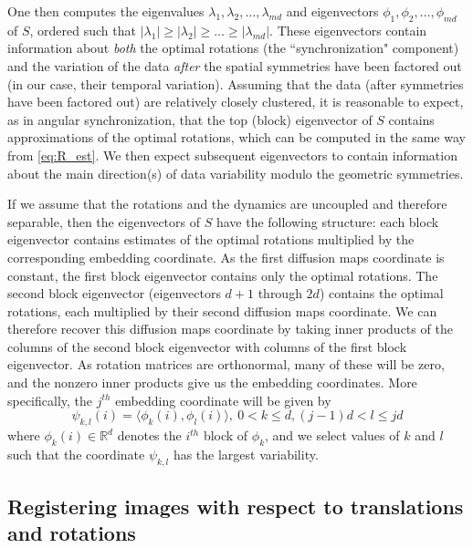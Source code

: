 \documentclass[12pt]{article}
\begin{document}
One then computes the eigenvalues $\lambda_1, \lambda_2, \dots, \lambda_{md}$ and eigenvectors $\phi_1, \phi_2, \dots, \phi_{md}$ of $S$, ordered such that $|\lambda_1| \ge |\lambda_2| \ge \dots \ge |\lambda_{md}|$.
%
These eigenvectors contain information about {\it both} the optimal rotations (the ``synchronization" component) and the
variation of the data {\it after} the spatial symmetries have been factored out (in our case, their temporal variation).
%
Assuming that the data (after symmetries have been factored out) are relatively closely clustered, it is reasonable
to expect, as in angular synchronization, that the top (block) eigenvector of $S$ contains approximations of the optimal rotations,
which can be computed in the same way from \eqref{eq:R_est}.
%
We then expect subsequent eigenvectors to contain information about the main direction(s) of data variability modulo the geometric symmetries.
%

If we assume that the rotations and the dynamics are uncoupled and therefore separable, then the eigenvectors of $S$ have the following structure: each block eigenvector contains estimates of the optimal rotations multiplied by the corresponding embedding coordinate.
%
As the first diffusion maps coordinate is constant, the first block eigenvector contains only the optimal rotations.
%
The second block eigenvector (eigenvectors $d+1$ through $2d$) contains the optimal rotations, each multiplied by their second diffusion maps coordinate. 
%
We can therefore recover this diffusion maps coordinate by taking inner products of the columns of the second block eigenvector with columns of the first block eigenvector.
%
As rotation matrices are orthonormal, many of these will be zero, 
and the nonzero inner products give us the embedding coordinates.
%
More specifically, the $j^{th}$ embedding coordinate will be given by
\begin{equation}
\psi_{k,l} (i) = \langle \phi_k(i), \phi_l(i) \rangle, \: 0 < k \le d, (j-1)d < l \le jd
\end{equation}
where $\phi_k(i) \in \mathbb{R}^d$ denotes the $i^{th}$ block of $\phi_k$, 
and we select values of $k$ and $l$ such that the coordinate $\psi_{k, l}$ has the largest variability. 
%

\subsection{Registering images with respect to translations and rotations} \label{subsec:trans_rot_register}
\end{document}
